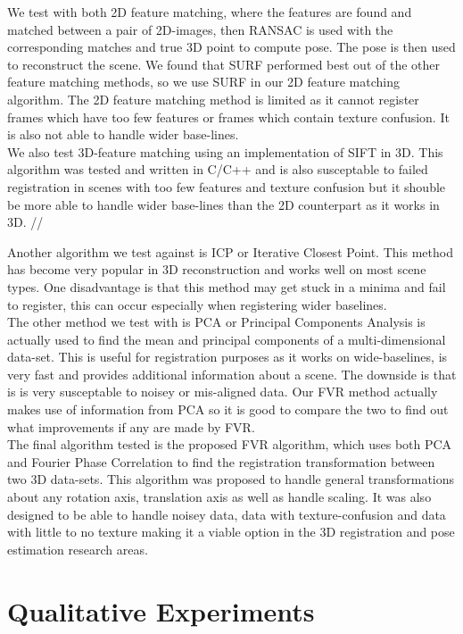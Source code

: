 We test with both 2D feature matching, where the features are found and matched between a pair of 2D-images, then RANSAC is used with the corresponding matches and true 3D point to compute pose. The pose is then used to reconstruct the scene. We found that SURF performed best out of the other feature matching methods, so we use SURF in our 2D feature matching algorithm. The 2D feature matching method is limited as it cannot register frames which have too few features or frames which contain texture confusion. It is also not able to handle wider base-lines. \\

We also test 3D-feature matching using an implementation of SIFT in 3D. This algorithm was tested and written in C/C++ and is also susceptable to failed registration in scenes with too few features and texture confusion but it shouble be more able to handle wider base-lines than the 2D counterpart as it works in 3D. //

Another algorithm we test against is ICP or Iterative Closest Point. This method has become very popular in 3D reconstruction and works well on most scene types. One disadvantage is that this method may get stuck in a minima and fail to register, this can occur especially when registering wider baselines. \\

The other method we test with is PCA or Principal Components Analysis is actually used to find the mean and principal components of a multi-dimensional data-set. This is useful for registration purposes as it works on wide-baselines, is very fast and provides additional information about a scene. The downside is that is is very susceptable to noisey or mis-aligned data. Our FVR method actually makes use of information from PCA so it is good to compare the two to find out what improvements if any are made by FVR. \\

The final algorithm tested is the proposed FVR algorithm, which uses both PCA and Fourier Phase Correlation to find the registration transformation between two 3D data-sets. This algorithm was proposed to handle general transformations about any rotation axis, translation axis as well as handle scaling. It was also designed to be able to handle noisey data, data with texture-confusion and data with little to no texture making it a viable option in the 3D registration and pose estimation research areas.


\section{Qualitative Experiments}

